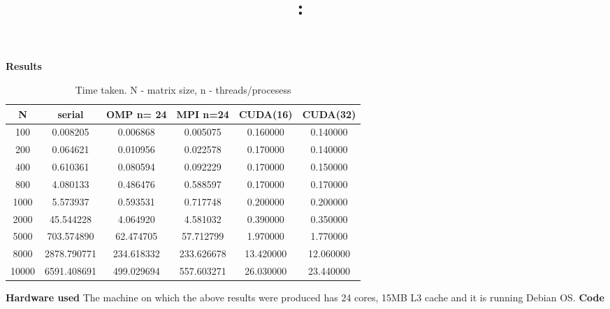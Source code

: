 \documentclass{article}
\title{
	\vspace{2in}
	\textmd{\textbf{\hmwkClass:\ \hmwkTitle}}\\
	\vspace{3in}
}
\author{\textbf{\hmwkAuthorName}}
\date{} %
\begin{document}



\textbf{Results}

\begin{table}[h]
	\caption{Time taken. N - matrix size, n - threads/procesess}
	\centering
	\begin{tabular}{| S[round-precision=3] | S[round-precision=3] | S[round-precision=3] | S[round-precision=3] | S[round-precision=3] | S[round-precision=3] |}
			\hline
			{N}&{serial} & {OMP n= 24} & {MPI n=24} & {CUDA(16)} & {CUDA(32)}\\ \hline
			{100}&0.008205
			&0.006868 &0.005075 &0.160000 &0.140000 \\ \hline

			{200}&0.064621&0.010956
			&0.022578&0.170000 &0.140000\\ \hline

			{400} &0.610361&0.080594 
			&0.092229&0.170000 &0.150000\\ \hline

			{800}&4.080133&0.486476
			&0.588597&0.170000 &0.170000\\ \hline

			{1000}&5.573937&0.593531
			&0.717748 &0.200000 &0.200000\\ \hline

			{2000}&45.544228&4.064920
			&4.581032 &0.390000 &0.350000\\ \hline

			{5000}&703.574890&62.474705
			&57.712799 &1.970000 &1.770000\\ \hline

			{8000}&2878.790771 
			&234.618332
			&233.626678 &13.420000 &12.060000 \\ \hline

			{10000}&6591.408691 
			&499.029694&557.603271 &26.030000 &23.440000\\ 
			\hline
		\end{tabular}


\end{table}

\textbf{Hardware used}
The machine on which the above results were produced has 24 cores, 15MB L3 cache and it is running Debian OS.
\newpage
\textbf{Code}

\end{document}
